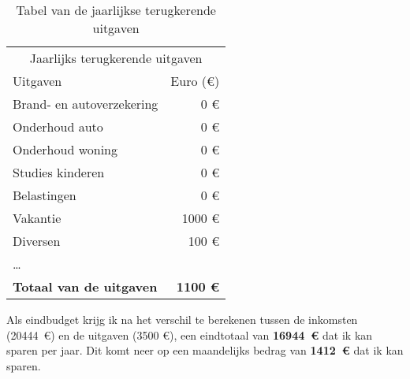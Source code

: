 \begin{table}[ht]
\begin{minipage}[b]{0.45\linewidth}
		
	\end{minipage}
	\hspace{0.5cm}
	\begin{minipage}[b]{0.45\linewidth}
		\centering
			\begin{tabular}{@{}lr@{}}
				\toprule
				  \multicolumn{2}{c}{Jaarlijks terugkerende uitgaven}   \\
				\cmidrule(r){1-2}
				Uitgaven  &        Euro (\euro{}) \\ \midrule
				Brand- en autoverzekering       &             0 \euro{} \\
				Onderhoud auto                  &             0 \euro{} \\
				Onderhoud woning                &             0 \euro{} \\
				Studies kinderen                &             0 \euro{} \\
				Belastingen                     &             0 \euro{} \\
				Vakantie                        &          1000 \euro{} \\
				Diversen                        &           100 \euro{} \\
				\dots                           &  \\ \toprule
				\textbf{Totaal van de uitgaven} & \textbf{1100 \euro{}} \\ \bottomrule
			\end{tabular}
			\caption{Tabel van de jaarlijkse terugkerende uitgaven}
			\label{tab:tabeljaarlijksterugkerendeuitgaven}
	\end{minipage}
\end{table}

Als eindbudget krijg ik na het verschil te berekenen tussen de inkomsten (20444~\euro{}) en de uitgaven (3500 \euro{}), een eindtotaal van \textbf{16944~\euro{}} dat ik kan sparen per jaar. Dit komt neer op een maandelijks bedrag van \textbf{1412~\euro{}} dat ik kan sparen.

